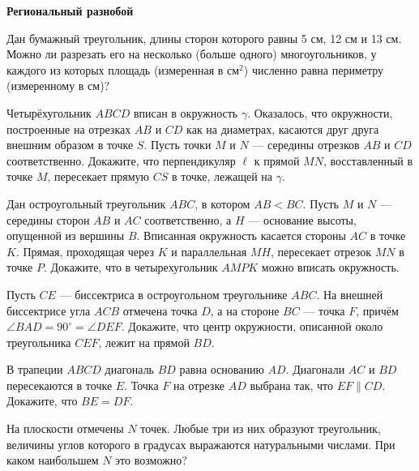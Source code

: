 \documentclass{article}
\begin{document}
    \large

    \begin{center}
        \textbf{Региональный разнобой}
    \end{center}


    \begin{enumerate_boxed}

        \item Дан бумажный треугольник, длины сторон которого равны 5 см,
        12 см и 13 см.
        Можно ли разрезать его на несколько (больше одного) многоугольников, у каждого из которых площадь (измеренная в см$^2$) численно равна периметру (измеренному в см)?

        \item Четырёхугольник $ABCD$ вписан в окружность $\gamma$.
        Оказалось, что окружности, построенные на отрезках $AB$ и $CD$ как на диаметрах, касаются друг друга внешним образом в точке $S$.
        Пусть точки $M$ и $N$ — середины отрезков $AB$ и $CD$ соответственно.
        Докажите, что перпендикуляр $\ell$ к прямой $MN$, восставленный в точке $M$, пересекает прямую $CS$ в точке, лежащей на $\gamma$.

        \item Дан остроугольный треугольник $ABC$, в котором $AB < BC$.
        Пусть $M$ и $N$ — середины сторон $AB$ и $AC$ соответственно, а $H$ — основание высоты, опущенной из вершины $B$.
        Вписанная окружность касается стороны $AC$ в точке $K$.
        Прямая, проходящая через $K$ и параллельная $MH$, пересекает отрезок $MN$ в точке $P$.
        Докажите, что в четырехугольник $AMPK$ можно вписать окружность.

        \item  Пусть $CE$ — биссектриса в остроугольном треугольнике $ABC$.
        На внешней биссектрисе угла $ACB$ отмечена точка $D$, а на стороне $BC$ — точка $F$, причём $\angle BAD = 90^\circ = \angle DEF$.
        Докажите, что центр окружности, описанной около треугольника $CEF$, лежит на прямой $BD$.

        \item  В трапеции $ABCD$ диагональ $BD$ равна основанию $AD$.
        Диагонали $AC$ и $BD$ пересекаются в точке $E$.
        Точка $F$ на отрезке $AD$ выбрана так, что $EF \parallel CD$.
        Докажите, что $BE = DF$.

        \item На плоскости отмечены $N$ точек.
        Любые три из них образуют треугольник, величины углов которого в градусах выражаются натуральными числами.
        При каком наибольшем $N$ это возможно?


\end{enumerate_boxed}
\end{document}
